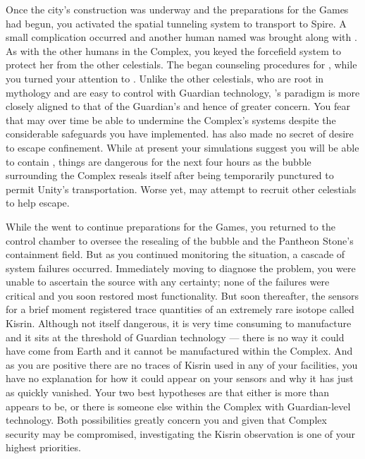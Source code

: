 \documentclass[char]{guardians}
\begin{document}
Once the city's construction was underway and the preparations for the Games had begun, you activated the spatial tunneling system to transport \cUnity{} to Spire. A small complication occurred and another human named \cKachiko{\intro} was brought along with \cUnity{}. As with the other humans in the Complex, you keyed the forcefield system to protect her from the other celestials. The \cCaretaker{} began counseling procedures for \cKachiko{}, while you turned your attention to \cUnity{}. Unlike the other celestials, who are root in mythology and are easy to control with Guardian technology, \cUnity{}'s paradigm is more closely aligned to that of the Guardian's and hence of greater concern. You fear that \cUnity{} may over time be able to undermine the Complex's systems despite the considerable safeguards you have implemented. \cUnity{} has also made no secret of \cUnity{\their} desire to escape confinement. While at present your simulations suggest you will be able to contain \cUnity{}, things are dangerous for the next four hours as the bubble surrounding the Complex reseals itself after being temporarily punctured to permit Unity's transportation. Worse yet, \cUnity{} may attempt to recruit other celestials to help \cUnity{\them} escape.

While the \cCaretaker{} went to continue preparations for the Games, you returned to the control chamber to oversee the resealing of the bubble and the Pantheon Stone's containment field. But as you continued monitoring the situation, a cascade of system failures occurred. Immediately moving to diagnose the problem, you were unable to ascertain the source with any certainty; none of the failures were critical and you soon restored most functionality. But soon thereafter, the sensors for a brief moment registered trace quantities of an extremely rare isotope called Kisrin. Although not itself dangerous, it is very time consuming to manufacture and it sits at the threshold of Guardian technology --- there is no way it could have come from Earth and it cannot be manufactured within the Complex. And as you are positive there are no traces of Kisrin used in any of your facilities, you have no explanation for how it could appear on your sensors and why it has just as quickly vanished. Your two best hypotheses are that either \cUnity{} is more than \cUnity{\they} appears to be, or there is someone else within the Complex with Guardian-level technology. Both possibilities greatly concern you and given that Complex security may be compromised, investigating the Kisrin observation is one of your highest priorities.
\end{document}
